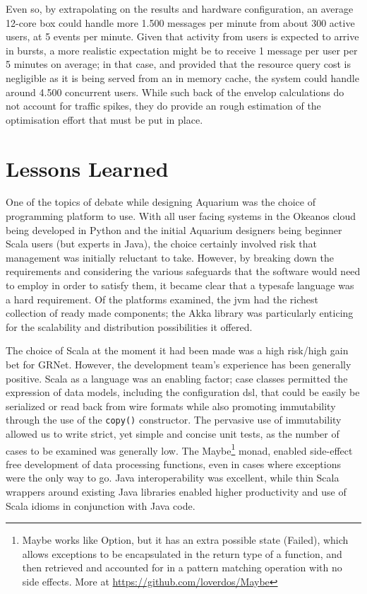 \documentclass[preprint,10pt]{sigplanconf}
\begin{document}
Even so, by extrapolating on the results and hardware configuration, an average
12-core box could handle more 1.500 messages per minute from about 300 active
users, at 5 events per minute. Given that activity from users is expected to
arrive in bursts, a more realistic expectation might be to receive 1 message
per user per 5 minutes on average; in that case, and provided that the resource
query cost is negligible as it is being served from an in memory cache, the
system could handle around 4.500 concurrent users. While such back of the
envelop calculations do not account for traffic spikes, they do provide an
rough estimation of the optimisation effort that must be put in place. 


\section{Lessons Learned}

One of the topics of debate while designing Aquarium was the choice of
programming platform to use. With all user facing systems in the Okeanos cloud
being developed in Python and the initial Aquarium designers being beginner
Scala users (but experts in Java), the choice certainly involved risk that
management was initially reluctant to take. However, by breaking down the
requirements and considering the various safeguards that the software would
need to employ in order to satisfy them, it became clear that a
typesafe language was a hard requirement. Of the platforms examined, the {\sc
jvm} had the richest collection of ready made components; the Akka library was
particularly enticing for the scalability and distribution possibilities it
offered.

The choice of Scala at the moment it had been made was a high risk/high gain
bet for GRNet. However, the development team's experience has been generally
positive. Scala as a language was an enabling factor; case classes permitted
the expression of data models, including the configuration {\sc dsl}, that
could be easily be serialized or read back from wire formats while also
promoting immutability through the use of the \texttt{copy()} constructor. The
pervasive use of immutability allowed us to write strict, yet simple and
concise unit tests, as the number of cases to be examined was generally low.
The \textsf{Maybe}\footnote{\textsf{Maybe} works like \textsf{Option}, but it
has an extra possible state (\textsf{Failed}), which allows exceptions to be
encapsulated in the return type of a function, and then retrieved and accounted
for in a pattern matching operation with no side effects. More at
\url{https://github.com/loverdos/Maybe}} monad, enabled side-effect free
development of data processing functions, even in cases where exceptions were
the only way to go. Java interoperability was excellent, while thin Scala
wrappers around existing Java libraries enabled higher productivity and use of
Scala idioms in conjunction with Java code.
\end{document}
